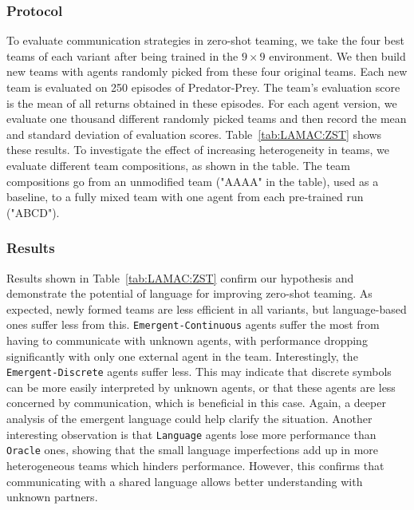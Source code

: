 \subsubsection{Protocol}

To evaluate communication strategies in zero-shot teaming, we take the four best teams of each variant after being trained in the $9\times 9$ environment. We then build new teams with agents randomly picked from these four original teams. Each new team is evaluated on 250 episodes of Predator-Prey. The team's evaluation score is the mean of all returns obtained in these episodes. For each agent version, we evaluate one thousand different randomly picked teams and then record the mean and standard deviation of evaluation scores. Table~\ref{tab:LAMAC:ZST} shows these results. To investigate the effect of increasing heterogeneity in teams, we evaluate different team compositions, as shown in the table. The team compositions go from an unmodified team ("AAAA" in the table), used as a baseline, to a fully mixed team with one agent from each pre-trained run ("ABCD"). 

\subsubsection{Results}

Results shown in Table~\ref{tab:LAMAC:ZST} confirm our hypothesis and demonstrate the potential of language for improving zero-shot teaming. As expected, newly formed teams are less efficient in all variants, but language-based ones suffer less from this. \texttt{Emergent-Continuous} agents suffer the most from having to communicate with unknown agents, with performance dropping significantly with only one external agent in the team. Interestingly, the \texttt{Emergent-Discrete} agents suffer less. This may indicate that discrete symbols can be more easily interpreted by unknown agents, or that these agents are less concerned by communication, which is beneficial in this case. Again, a deeper analysis of the emergent language could help clarify the situation. Another interesting observation is that \texttt{Language} agents lose more performance than \texttt{Oracle} ones, showing that the small language imperfections add up in more heterogeneous teams which hinders performance. However, this confirms that communicating with a shared language allows better understanding with unknown partners. 

